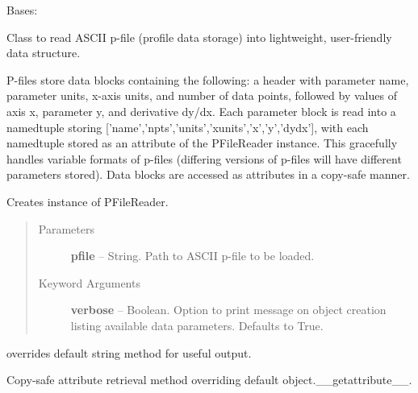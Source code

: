 \documentclass[letterpaper,10pt,english]{sphinxmanual}
\begin{document}
\begin{fulllineitems}
\label{eqtools:eqtools.pfilereader.PFileReader}
Bases: 

Class to read ASCII p-file (profile data storage) into lightweight, user-friendly data structure.

P-files store data blocks containing the following: a header with parameter
name, parameter units, x-axis units, and number of data points, followed by values of
axis x, parameter y, and derivative dy/dx.  Each parameter block is read into a
namedtuple storing {[}'name','npts','units','xunits','x','y','dydx'{]}, with each namedtuple
stored as an attribute of the PFileReader instance.  This gracefully handles variable
formats of p-files (differing versions of p-files will have different parameters stored).
Data blocks are accessed as attributes in a copy-safe manner.

Creates instance of PFileReader.
\begin{quote}\begin{description}
\item[{Parameters }] \leavevmode
\textbf{pfile} --
String.
Path to ASCII p-file to be loaded.

\item[{Keyword Arguments}] \leavevmode
\textbf{verbose} --
Boolean.
Option to print message on object creation listing available data
parameters. Defaults to True.

\end{description}\end{quote}

\begin{fulllineitems}
\label{eqtools:eqtools.pfilereader.PFileReader.__str__}
overrides default string method for useful output.

\end{fulllineitems}


\begin{fulllineitems}
\label{eqtools:eqtools.pfilereader.PFileReader.__getattribute__}
Copy-safe attribute retrieval method overriding default object.\_\_getattribute\_\_.


\end{fulllineitems}
\end{fulllineitems}
\end{document}
